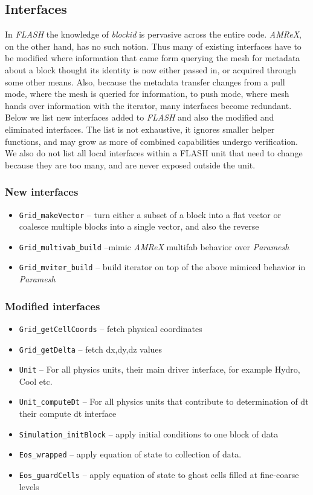 \documentclass{article}
\newcommand{\code}[1]{{\tt#1}}
\newcommand{\flash}{{\it FLASH}\xspace}
\newcommand{\amrex}{{\it AMReX}\xspace}
\newcommand{\paramesh}{{\it Paramesh}\xspace}
\begin{document}
\subsection{Interfaces}
\label{sec:flash-interfaces}
In \flash the knowledge of {\it blockid} is pervasive across the
entire code. \amrex, on the other hand, has no such notion. Thus many
of existing interfaces have to be modified where information that came
form querying the mesh for metadata about a block thought its identity
is now either passed in, or acquired through some other means. Also,
because the metadata transfer changes from a pull mode, where the mesh
is queried for information, to push mode, where mesh hands over
information with the iterator, many interfaces become redundant. Below
we list new interfaces added to \flash and also the modified and
eliminated interfaces. The list is not exhaustive, it ignores smaller
helper functions, and may grow as more of combined capabilities
undergo verification. We also do not list all local interfaces within
a FLASH unit that need to change because they are too many, and are
never exposed outside the unit.

\subsubsection*{New interfaces}
\begin{itemize}
\item \code{Grid\_makeVector} -- turn either a subset of a block into
  a flat vector or coalesce multiple blocks into a single vector, and
  also the reverse
\item \code{Grid\_multivab\_build} --mimic \amrex multifab behavior
  over \paramesh
\item \code{Grid\_mviter\_build} -- build iterator on top of the above
  mimiced behavior in \paramesh 
\end{itemize}
\subsubsection*{Modified interfaces}
\begin{itemize}
\item \code{Grid\_getCellCoords} -- fetch physical coordinates 
\item \code{Grid\_getDelta} -- fetch dx,dy,dz values
\item \code{Unit} -- For all physics units, their main driver
  interface, for example Hydro, Cool etc.
\item \code{Unit\_computeDt} -- For all physics units that contribute
  to determination of dt their compute dt interface
\item \code{Simulation\_initBlock} -- apply initial conditions to one
  block of data
\item \code{Eos\_wrapped} -- apply equation of state to collection of data.
\item \code{Eos\_guardCells} -- apply equation of state to ghost cells
  filled at fine-coarse levels
\end{itemize}
\end{document}
